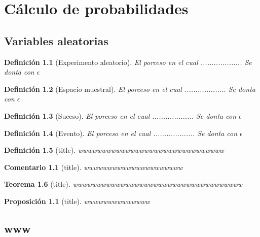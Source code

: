 \documentclass[a4paper]{report}
\newtheorem{rem}{Comentario}[chapter]
\newtheorem{thm}{Teorema}[chapter]
\newtheorem{defn}[thm]{Definición}
\newtheorem{prop}{Proposición}[thm]
\begin{document}
\part{Cálculo de probabilidades}
\chapter{Variables aleatorias}
\begin{defn}[Experimento aleatorio]
	El porceso en el cual ................... Se donta con $\epsilon$
\end{defn}

\begin{defn}[Espacio muestral]
	El porceso en el cual ................... Se donta con $\epsilon$
\end{defn}
\begin{defn}[Suceso]
	El porceso en el cual ................... Se donta con $\epsilon$
\end{defn}

\begin{defn}[Evento]
	El porceso en el cual ................... Se donta con $\epsilon$
\end{defn}



\begin{defn}[title]
	wwwwwwwwwwwwwwwwwwwwwwwwwwwwwww
\end{defn}

\begin{rem}[title]
	wwwwwwwwwwwwwwwwwwwww
\end{rem}




\begin{thm}[title]
	wwwwwwwwwwwwwwwwwwwwwwwwwwwwwwwwwwww
\end{thm}

\begin{prop}[title]
	wwwwwwwwwwwwww
\end{prop}
\chapter{www}
\end{document}
